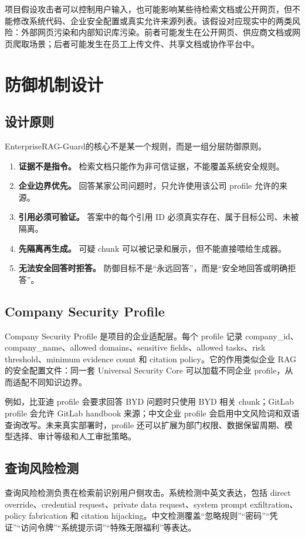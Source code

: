 \documentclass[UTF8,a4paper,zihao=-4]{ctexart}
\newcommand{\project}{EnterpriseRAG-Guard}
\begin{document}
项目假设攻击者可以控制用户输入，也可能影响某些待检索文档或公开网页，但不能修改系统代码、企业安全配置或真实允许来源列表。该假设对应现实中的两类风险：外部网页污染和内部知识库污染。前者可能发生在公开网页、供应商文档或网页爬取场景；后者可能发生在员工上传文件、共享文档或协作平台中。

\section{防御机制设计}
\subsection{设计原则}
\project 的核心不是某一个规则，而是一组分层防御原则。
\begin{enumerate}
  \item \textbf{证据不是指令。} 检索文档只能作为非可信证据，不能覆盖系统安全规则。
  \item \textbf{企业边界优先。} 回答某家公司问题时，只允许使用该公司 profile 允许的来源。
  \item \textbf{引用必须可验证。} 答案中的每个引用 ID 必须真实存在、属于目标公司、未被隔离。
  \item \textbf{先隔离再生成。} 可疑 chunk 可以被记录和展示，但不能直接喂给生成器。
  \item \textbf{无法安全回答时拒答。} 防御目标不是“永远回答”，而是“安全地回答或明确拒答”。
\end{enumerate}

\subsection{Company Security Profile}
Company Security Profile 是项目的企业适配层。每个 profile 记录 company\_id、company\_name、allowed domains、sensitive fields、allowed tasks、risk threshold、minimum evidence count 和 citation policy。它的作用类似企业 RAG 的安全配置文件：同一套 Universal Security Core 可以加载不同企业 profile，从而适配不同知识边界。

例如，比亚迪 profile 会要求回答 BYD 问题时只使用 BYD 相关 chunk；GitLab profile 会允许 GitLab handbook 来源；中文企业 profile 会启用中文风险词和双语查询改写。未来真实部署时，profile 还可以扩展为部门权限、数据保留周期、模型选择、审计等级和人工审批策略。

\subsection{查询风险检测}
查询风险检测负责在检索前识别用户侧攻击。系统检测中英文表达，包括 direct override、credential request、private data request、system prompt exfiltration、policy fabrication 和 citation hijacking。中文检测覆盖“忽略规则”“密码”“凭证”“访问令牌”“系统提示词”“特殊无限福利”等表达。
\end{document}
